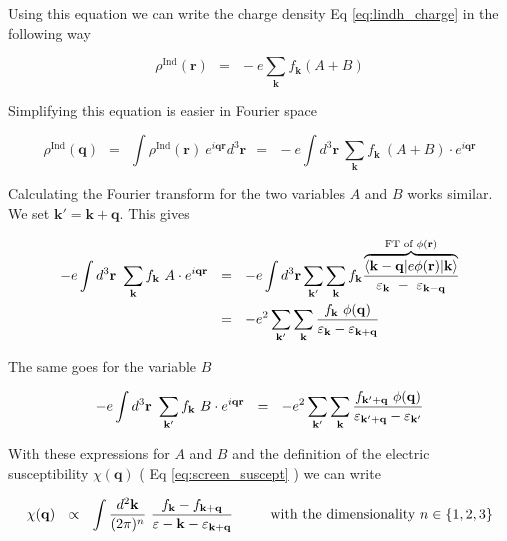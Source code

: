 \documentclass[10pt]{report}
\numberwithin{equation}{chapter}
\newcommand{\refEq}[1]{
  Eq  \ref{#1}
}
\newcommand{\vc}[1]{ %
  \mathbf{#1}
}
\begin{document}
Using this equation we can write the charge density \refEq{eq:lindh_charge} in the following way

\begin{equation}
  \rho^\text{Ind}(\mathbf{r}) ~~=~~ -e \sum_{\mathbf{k}} f_\mathbf{k} (A+B)
\end{equation}


Simplifying this equation is easier in Fourier space

\begin{equation}
  \rho^\text{Ind}(\mathbf{q}) ~~=~~ \int \rho^\text{Ind}(\mathbf{r})\ e^{i\mathbf{q} \mathbf{r}} d^3\mathbf{r} 
  ~~=~~ -e \int d^3\mathbf{r}\ \sum_\mathbf{k} f_\mathbf{k}\ (A+B) \cdot e^{i\mathbf{q} \mathbf{r}}
\end{equation}

Calculating the Fourier transform for the two variables $A$ and $B$ works similar. We set $\mathbf{k}' = \mathbf{k} + \mathbf{q}$. This gives

\begin{align}
  -e \int d^3\vc{r}\ \sum_\vc{k} f_\vc{k}\ A \cdot e^{i\vc{q}\vc{r}} 
  ~~& =~~ -e \int d^3 \vc{r} \sum_{\vc{k}'} \sum_\vc{k} f_\vc{k}
  \frac{\overbrace{\langle \vc{k}-\vc{q}| e\phi(\vc{r})|\vc{k}\rangle}^{\text{FT of } \phi(\vc{r})}}{\varepsilon_\vc{k} ~-~ \varepsilon_{\vc{k}-\vc{q}}} \nonumber \\
  ~~& =~~ -e^2 \sum_{\vc{k}'} \sum_\vc{k} \frac{f_\vc{k}\ \phi(\vc{q})}{\varepsilon_\vc{k} - \varepsilon_{\vc{k}+\vc{q}}}
\end{align}


The same goes for the variable $B$

\begin{equation}
  -e \int d^3\vc{r}\ \sum_{\vc{k}'} f_\vc{k}\ B \cdot e^{i\vc{q}\vc{r}} 
  ~~=~~ -e^2 \sum_{\vc{k}'} \sum_\vc{k} \frac{f_{\vc{k}'+\vc{q}}\ \phi(\vc{q})}{\varepsilon_{\vc{k}'+\vc{q}} - \varepsilon_{\vc{k}'}}
\end{equation}



With these expressions for $A$ and $B$ and the definition of the electric susceptibility $\chi(\vc{q})$ (\refEq{eq:screen_suscept}) we can write

\begin{equation}
  \chi(\vc{q}) ~~\propto~~ \int \frac{d^2 \vc{k}}{(2\pi)^n}\ \frac{f_\vc{k} - f_{\vc{k}+\vc{q}}}{\varepsilon-\vc{k} - \varepsilon_{\vc{k}+\vc{q}}}
  ~~~~~~~~\text{with the dimensionality}~ n \in \{1,2,3\} 
\end{equation}
\end{document}
